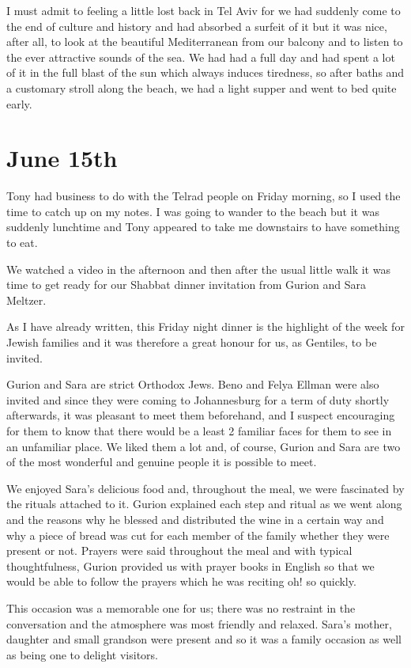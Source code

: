 I must admit to feeling a little lost back in Tel Aviv for we had
suddenly come to the end of culture and history and had absorbed a
surfeit of it but it was nice, after all, to look at the beautiful
Mediterranean from our balcony and to listen to the ever attractive
sounds of the sea. We had had a full day and had spent a lot of it in
the full blast of the sun which always induces tiredness, so after
baths and a customary stroll along the beach, we had a light supper
and went to bed quite early.


\section{June 15th}

Tony had business to do with the Telrad people on Friday morning, so I
used the time to catch up on my notes. I was going to wander to the
beach but it was suddenly lunchtime and Tony appeared to take me
downstairs to have something to eat.

We watched a video in the afternoon and then after the usual little
walk it was time to get ready for our Shabbat dinner invitation from
Gurion and Sara Meltzer.

As I have already written, this Friday night dinner is the highlight
of the week for Jewish families and it was therefore a great honour
for us, as Gentiles, to be invited.

Gurion and Sara are strict Orthodox Jews. Beno and Felya Ellman were
also invited and since they were coming to Johannesburg for a term of
duty shortly afterwards, it was pleasant to meet them beforehand, and
I suspect encouraging for them to know that there would be a least 2
familiar faces for them to see in an unfamiliar place. We liked them a
lot and, of course, Gurion and Sara are two of the most wonderful and
genuine people it is possible to meet.

We enjoyed Sara's delicious food and, throughout the meal, we were
fascinated by the rituals attached to it. Gurion explained each step
and ritual as we went along and the reasons why he blessed and
distributed the wine in a certain way and why a piece of bread was
cut for each member of the family whether they were present or
not. Prayers were said throughout the meal and with typical
thoughtfulness, Gurion provided us with prayer books in English so
that we would be able to follow the prayers which he was reciting oh!
so quickly.

This occasion was a memorable one for us; there was no restraint in
the conversation and the atmosphere was most friendly and
relaxed. Sara's mother, daughter and small grandson were present and
so it was a family occasion as well as being one to delight visitors.

